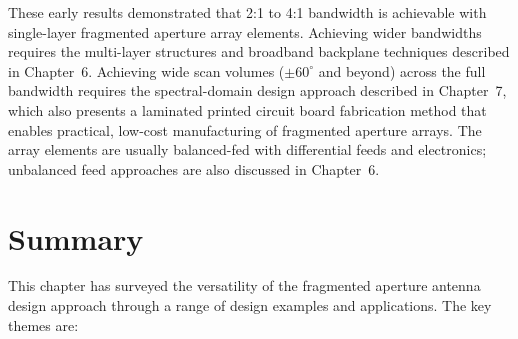 These early results demonstrated that 2:1 to 4:1 bandwidth is achievable with single-layer fragmented aperture array elements.  Achieving wider bandwidths requires the multi-layer structures and broadband backplane techniques described in Chapter~6.  Achieving wide scan volumes ($\pm 60^{\circ}$ and beyond) across the full bandwidth requires the spectral-domain design approach described in Chapter~7, which also presents a laminated printed circuit board fabrication method that enables practical, low-cost manufacturing of fragmented aperture arrays.  The array elements are usually balanced-fed with differential feeds and electronics; unbalanced feed approaches are also discussed in Chapter~6.

\section{Summary}

This chapter has surveyed the versatility of the fragmented aperture antenna design approach through a range of design examples and applications.  The key themes are:

